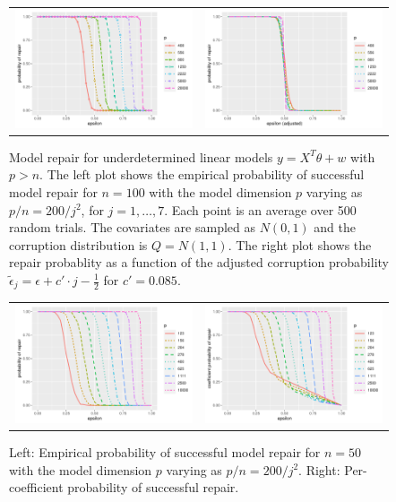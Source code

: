 \begin{figure}[ht]
  \begin{center}
    \begin{tabular}{cc}
      \includegraphics[width=.47\textwidth]{figures/fig3a} &
      \includegraphics[width=.47\textwidth]{figures/fig3b}\\[-10pt]
    \end{tabular}
    \caption{Model repair for underdetermined linear models $y=X^T\theta + w$ with $p>n$. The left plot shows the empirical probability of successful model repair for $n=100$ with the model dimension $p$
    varying as $p/n = 200 /j^2$, for $j=1,\ldots, 7$. Each point is an average over 500 random trials. The covariates are sampled as $N(0,1)$ and the corruption distribution is $Q=N(1,1)$. The right plot shows the repair probablity as a function
    of the adjusted corruption probability $\tilde\epsilon_j = \epsilon + c'\cdot j - \frac{1}{2}$ for $c'=0.085$.}
    \label{fig:exp1}
    \vskip20pt
    \begin{tabular}{cc}
      \includegraphics[width=.47\textwidth]{figures/fig4b} &
      \includegraphics[width=.47\textwidth]{figures/fig4a}\\[-10pt]
    \end{tabular}
  \end{center}
\caption{Left: Empirical probability of successful model repair for $n=50$ with the model dimension $p$
varying as $p/n = 200 /j^2$. Right: Per-coefficient probability of successful repair.}
\label{fig:exp1b}
\end{figure}


